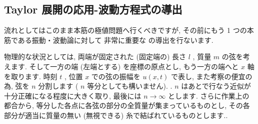 \documentclass[openany, a4paper, oneside]{book}
\theoremstyle{break}
\theoremstyle{breakdefn}
\begin{document}
\subsection{Taylor 展開の応用-波動方程式の導出}
\label{sec-5-2-8-1}

流れとしてはこのまま本筋の極値問題へ行くべきですが, その前にもう 1 つの本筋である振動・波動論に対して
非常に重要な
の導出を行ないます.

物理的な状況としては, 両端が固定された (固定端の) 長さ $l$ , 質量 $m$ の弦を考えます.
そして一方の端 (左端とする) を座標の原点とし, もう一方の端へと $x$ 軸を取ります.
時刻 $t$ , 位置 $x$ での弦の振幅を $u (x,t)$ で表し,
また考察の便宜の為, 弦を $n$ 分割します ( $n$ 等分としても構いません). .
$n$ はあとで行なう近似が十分正確になる程度に大きく取り, 最後には $n \to \infty$ とします.
さらに作業上の都合から, 等分した各点に各弦の部分の全質量が集まっているものとし,
その各部分が適当に質量の無い (無視できる) 糸で結ばれているものとします..
\end{document}
